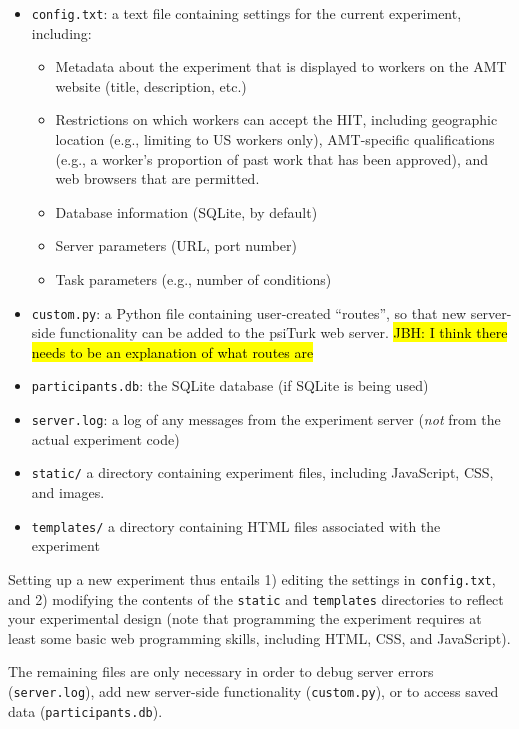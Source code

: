 \documentclass[twocolumn]{svjour3}          %
\newcommand{\psiturk}[0]{\textsf{psiTurk}}
\begin{document}
\begin{itemize}
\item \texttt{config.txt}: a text file containing settings for the current experiment, including:

\begin{itemize}
\item Metadata about the experiment that is displayed to workers on the AMT website (title, description, etc.)
\item Restrictions on which workers can accept the HIT, including geographic location (e.g., limiting to US workers only), AMT-specific qualifications (e.g., a worker's proportion of past work that has been approved), and web browsers that are permitted.
\item Database information (SQLite, by default)
\item Server parameters (URL, port number)
\item Task parameters (e.g., number of conditions)
\end{itemize}


\item \texttt{custom.py}: a Python file containing user-created ``routes'', so that new server-side functionality can be added to the \psiturk{} web server. \hl{JBH: I think there needs to be an explanation of what routes are}

\item \texttt{participants.db}: the SQLite database (if SQLite is being used)

\item \texttt{server.log}: a log of any messages from the experiment server (\emph{not} from the actual experiment code)

\item \texttt{static/} a directory containing experiment files, including JavaScript, CSS, and images.

\item \texttt{templates/} a directory containing HTML files associated with the experiment 
\end{itemize}

Setting up a new experiment thus entails 1) editing the settings in \texttt{config.txt}, and 2) modifying the contents of the \texttt{static} and \texttt{templates} directories to reflect your experimental design (note that programming the experiment requires at least some basic web programming skills, including HTML, CSS, and JavaScript).

The remaining files are only necessary in order to debug server errors (\texttt{server.log}), add new server-side functionality (\texttt{custom.py}), or to access saved data (\texttt{participants.db}).
\end{document}

